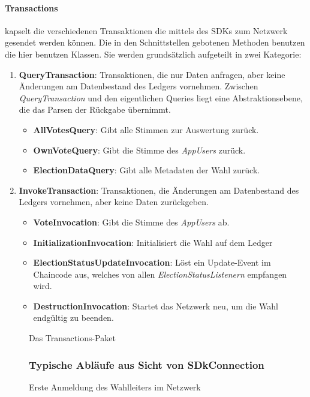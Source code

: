 \documentclass[parskip=full]{scrartcl}
\newcommand{\fakeparagraph}[1]{\textbf{#1}}
\begin{document}
	\paragraph{Transactions} kapselt die verschiedenen Transaktionen die mittels des SDKs zum Netzwerk gesendet werden können. Die in den Schnittstellen gebotenen Methoden benutzen die hier benutzen Klassen. Sie werden grundsätzlich aufgeteilt in zwei Kategorie:
	\begin{enumerate}
			\item\fakeparagraph{QueryTransaction}: Transaktionen, die nur Daten anfragen, aber keine Änderungen am Datenbestand des Ledgers vornehmen. Zwischen \textit{QueryTransaction} und den eigentlichen Queries liegt eine Abstraktionsebene, die das Parsen der Rückgabe übernimmt.
			\begin{itemize}
				\item \fakeparagraph{AllVotesQuery}: Gibt alle Stimmen zur Auswertung zurück.
				\item \fakeparagraph{OwnVoteQuery}: Gibt die Stimme des \textit{AppUsers} zurück.
				\item \fakeparagraph{ElectionDataQuery}: Gibt alle Metadaten der Wahl zurück.
			\end{itemize}
			\item \fakeparagraph{InvokeTransaction}: Transaktionen, die Änderungen am Datenbestand des Ledgers vornehmen, aber keine Daten zurückgeben.
			\begin{itemize}
				\item \fakeparagraph{VoteInvocation}: Gibt die Stimme des \textit{AppUsers} ab.
				\item \fakeparagraph{InitializationInvocation}: Initialisiert die Wahl auf dem Ledger
				\item \fakeparagraph{ElectionStatusUpdateInvocation}: Löst ein Update-Event im Chaincode aus, welches von allen \textit{ElectionStatusListenern} empfangen wird.
				\item \fakeparagraph{DestructionInvocation}: Startet das Netzwerk neu, um die Wahl endgültig zu beenden.
			\end{itemize}
	\end{enumerate}
	\begin{sidewaysfigure}[!h]
		\centering
		
		\caption{Das Transactions-Paket}
	\end{sidewaysfigure}
	\pagebreak
	\begin{sidewaysfigure}[!h]
		\subsubsection{Typische Abläufe aus Sicht von SDkConnection}
		\centering
		
		\caption{Erste Anmeldung des Wahlleiters im Netzwerk}
	\end{sidewaysfigure}
\end{document}
